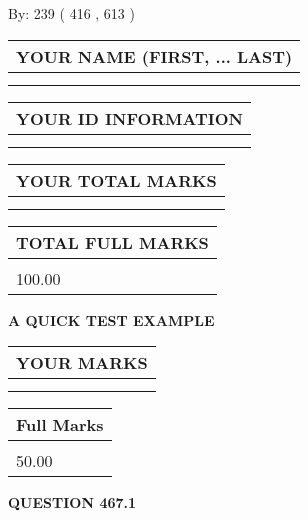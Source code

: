 \documentclass[12pt]{article}
\begin{document}
   
\hspace{1.0in} By: 
 239 ( 416 ,  613 )
   
   
   
   
\newpage 
\setcounter{page}{ 
   467001 } 
   
   
   
   
\noindent\begin{tabular}{|l|}
\hline
YOUR NAME (FIRST, ... LAST)  \\
\hline
 \\ 
 \\ 
\hline
\end{tabular}
\hspace{0.05in} \begin{tabular}{|l|}
\hline
 YOUR   ID   INFORMATION  \\
\hline
 \\ 
 \\ 
\hline
\end{tabular}
   
   
\vspace{0.2in}\noindent\begin{tabular}{|l|}
\hline
YOUR TOTAL MARKS  \\
\hline
 \\ 
 \\ 
\hline
\end{tabular}
\hspace{0.05in} \begin{tabular}{|l|}
\hline
TOTAL FULL MARKS  \\
\hline
 \\ 
100.00 \\
\hline
\end{tabular}
   
   
 \vspace{0.2in}
{\LARGE {\textbf{ A QUICK TEST EXAMPLE}}}
   
   
  
\vspace{0.2in}
  
\noindent\begin{tabular}{|l|}
\hline
 YOUR MARKS  \\
\hline
 \\ 
 \\ 
\hline
\end{tabular}
\hspace{0.05in} \begin{tabular}{|l|}
\hline
 Full Marks  \\
\hline
 \\ 
50.00 \\
\hline
\end{tabular}
{\textbf{\Large{QUESTION
467.1 
}}}
  
\end{document}
